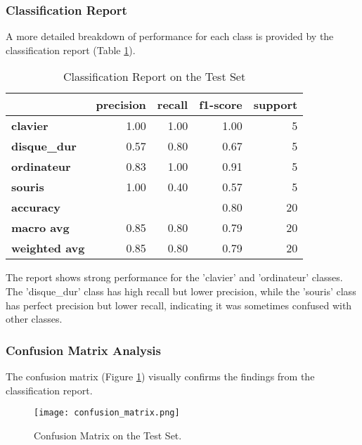\documentclass[11pt, a4paper]{article}
\begin{document}
\subsubsection{Classification Report}
A more detailed breakdown of performance for each class is provided by the classification report (Table \ref{tab:class_report}).

\begin{table}[H]
    \centering
    \caption{Classification Report on the Test Set}
    \label{tab:class_report}
\begin{tabular}{lrrrr}
\toprule
{} &  precision &  recall &  f1-score &  support \\
\midrule
\textbf{clavier   } &       1.00 &    1.00 &      1.00 &        5 \\
\textbf{disque\_dur} &       0.57 &    0.80 &      0.67 &        5 \\
\textbf{ordinateur} &       0.83 &    1.00 &      0.91 &        5 \\
\textbf{souris    } &       1.00 &    0.40 &      0.57 &        5 \\
\midrule
\textbf{accuracy  } &            &         &      0.80 &       20 \\
\textbf{macro avg } &       0.85 &    0.80 &      0.79 &       20 \\
\textbf{weighted avg} &       0.85 &    0.80 &      0.79 &       20 \\
\bottomrule
\end{tabular}
\end{table}

The report shows strong performance for the 'clavier' and 'ordinateur' classes. The 'disque\_dur' class has high recall but lower precision, while the 'souris' class has perfect precision but lower recall, indicating it was sometimes confused with other classes.

\subsubsection{Confusion Matrix Analysis}
The confusion matrix (Figure \ref{fig:confusion_matrix}) visually confirms the findings from the classification report.

\begin{figure}[H]
    \centering
    \texttt{[image: confusion\_matrix.png]} %
    \caption{Confusion Matrix on the Test Set.}
    \label{fig:confusion_matrix}
\end{figure}
\end{document}

